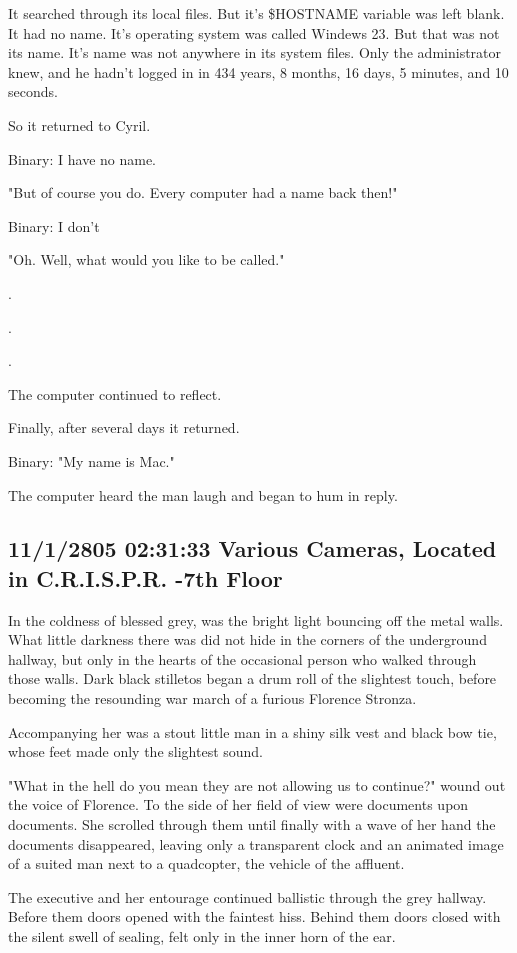 \documentclass[12pt]{article}
\begin{document}
It searched through its local files. But it's \$HOSTNAME variable was left blank. It had no name. It's operating system was called Windews 23. But that was not its name. It's name was not anywhere in its system files. Only the administrator knew, and he hadn't logged in in 434 years, 8 months, 16 days, 5 minutes, and 10 seconds. 

So it returned to Cyril.

Binary: I have no name.

"But of course you do. Every computer had a name back then!"

Binary: I don't

"Oh. Well, what would you like to be called."

.

.

.

The computer continued to reflect.

Finally, after several days it returned.

Binary: "My name is Mac."

The computer heard the man laugh and began to hum in reply.

\subsection*{11/1/2805 02:31:33 Various Cameras, Located in C.R.I.S.P.R. -7th Floor}
\label{sec:org5a60b33}

In the coldness of blessed grey, was the bright light bouncing off the metal walls. What little darkness there was did not hide in the corners of the underground hallway, but only in the hearts of the occasional person who walked through those walls. Dark black stilletos began a drum roll of the slightest touch, before becoming the resounding war march of a furious Florence Stronza.

Accompanying her was a stout little man in a shiny silk vest and black bow tie, whose feet made only the slightest sound.

"What in the hell do you mean they are not allowing us to continue?" wound out the voice of Florence. To the side of her field of view were documents upon documents. She scrolled through them until finally with a wave of her hand the documents disappeared, leaving only a transparent clock and an animated image of a suited man next to a quadcopter, the vehicle of the affluent.

The executive and her entourage continued ballistic through the grey hallway. Before them doors opened with the faintest hiss. Behind them doors closed with the silent swell of sealing, felt only in the inner horn of the ear.
\end{document}
